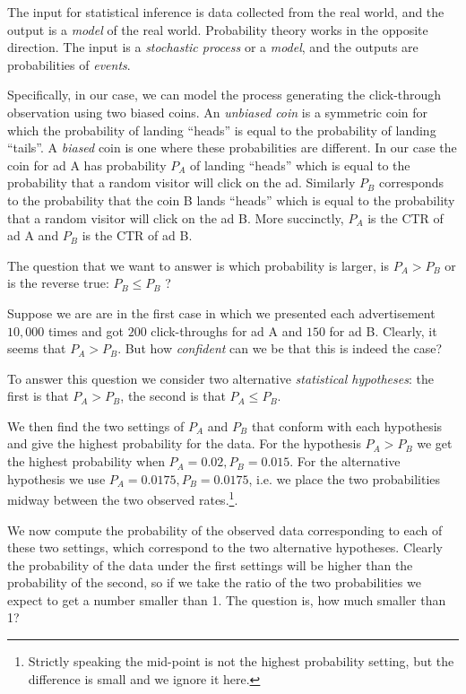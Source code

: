 The input for statistical inference is data collected from the real
world, and the output is a {\em model} of the real world. Probability
theory works in the opposite direction. The input is a {\em stochastic
  process} or a {\em model}, and the outputs are probabilities of {\em
  events}.

Specifically, in our case, we can model the process generating the
click-through observation using two biased coins. An {\em unbiased
  coin} is a symmetric coin for which the probability of landing
``heads'' is equal to the probability of landing ``tails''.  A {\em
  biased} coin is one where these probabilities are different.  In our
case the coin for ad A has probability $P_A$ of landing ``heads''
which is equal to the probability that a random visitor will click on
the ad. Similarly $P_B$ corresponds to the probability that the coin B
lands ``heads'' which is equal to the probability that a random
visitor will click on the ad B. More succinctly, $P_A$ is the CTR of
ad A and $P_B$ is the CTR of ad B.

The question that we want to answer is which probability is larger, is
$P_A>P_B$ or is the reverse true: $P_B \leq P_B$ ?

Suppose we are are in the first case in which we presented each
advertisement $10,000$ times and got $200$ click-throughs for ad A and
$150$ for ad B. Clearly, it seems that $P_A>P_B$. But how {\em
  confident} can we be that this is indeed the case?

To answer this question we consider two alternative {\em statistical
hypotheses}: the first is that $P_A>P_B$, the second is that $P_A
\leq P_B$. 

We then find the two settings of $P_A$ and $P_B$ that conform with
each hypothesis and give the highest probability for the data.  For
the hypothesis $P_A>P_B$ we get the highest probability when
$P_A=0.02,P_B=0.015$. For the alternative hypothesis we use
$P_A=0.0175,P_B=0.0175$, i.e. we place the two probabilities midway
between the two observed rates.\footnote{Strictly speaking the
  mid-point is not the highest probability setting, but the difference
  is small and we ignore it here.}.

We now compute the probability of the observed data corresponding to
each of these two settings, which correspond to the two alternative
hypotheses. Clearly the probability of the data under the first
settings will be higher than the probability of the second, so if we
take the ratio of the two probabilities we expect to get a number
smaller than 1. The question is, how much smaller than 1?

